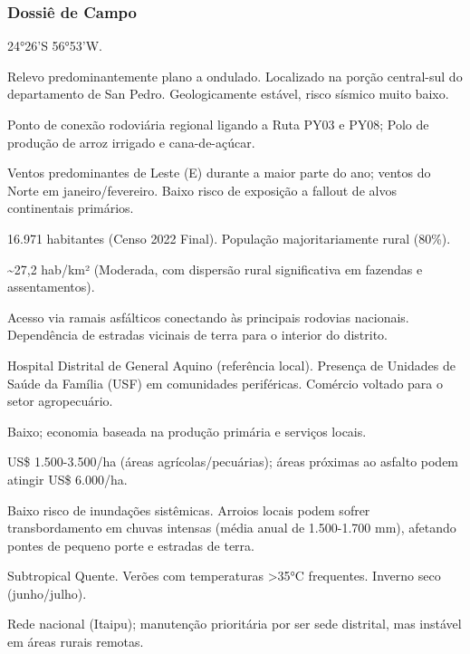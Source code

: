 \subsubsection{Dossiê de Campo}
\begin{description}[style=nextline,leftmargin=0.5cm,font=\bfseries]
\item[Coordenadas]  24°26'S 56°53'W.
\item[Topografia]  Relevo predominantemente plano a ondulado. Localizado na porção central-sul do departamento de San Pedro. Geologicamente estável, risco sísmico muito baixo.
\item[Alvos Estratégicos]  Ponto de conexão rodoviária regional ligando a Ruta PY03 e PY08; Polo de produção de arroz irrigado e cana-de-açúcar.
\item[Fallout]  Ventos predominantes de Leste (E) durante a maior parte do ano; ventos do Norte em janeiro/\allowbreak fevereiro. Baixo risco de exposição a fallout de alvos continentais primários.
\item[População]  16.971 habitantes (Censo 2022 Final). População majoritariamente rural (80\%).
\item[Densidade]  \textasciitilde 27,2 hab/\allowbreak km² (Moderada, com dispersão rural significativa em fazendas e assentamentos).
\item[Vias de Acesso]  Acesso via ramais asfálticos conectando às principais rodovias nacionais. Dependência de estradas vicinais de terra para o interior do distrito.
\item[Serviços]  Hospital Distrital de General Aquino (referência local). Presença de Unidades de Saúde da Família (USF) em comunidades periféricas. Comércio voltado para o setor agropecuário.
\item[Custo de Vida]  Baixo; economia baseada na produção primária e serviços locais.
\item[Preço da Terra]  US\$ 1.500-3.500/\allowbreak ha (áreas agrícolas/\allowbreak pecuárias); áreas próximas ao asfalto podem atingir US\$ 6.000/\allowbreak ha.
\item[Hidrologia]  Baixo risco de inundações sistêmicas. Arroios locais podem sofrer transbordamento em chuvas intensas (média anual de 1.500-1.700 mm), afetando pontes de pequeno porte e estradas de terra.
\item[Clima]  Subtropical Quente. Verões com temperaturas >35°C frequentes. Inverno seco (junho/\allowbreak julho).
\item[Energia]  Rede nacional (Itaipu); manutenção prioritária por ser sede distrital, mas instável em áreas rurais remotas.

\end{description}
